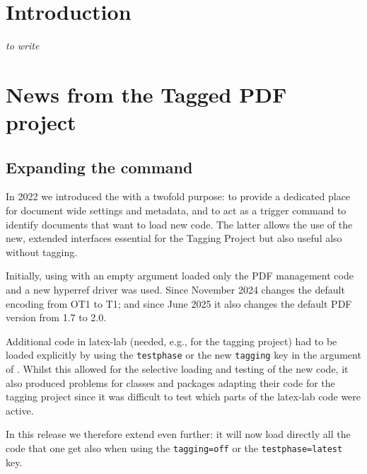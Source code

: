 \documentclass{ltnews}
\begin{document}
\maketitle
{  \spaceskip=3.33pt 
\tableofcontents}

\setlength{}

\medskip

\section{Introduction}

\emph{to write}


\section{News from the Tagged PDF project}

\subsection{Expanding the  command}

In 2022 we introduced the  with a twofold purpose:
to provide a dedicated place for document wide settings and metadata,
and to act as a trigger command to identify documents that want to load new code.
The latter allows the use of the new, extended interfaces essential for the Tagging Project
but also useful also without tagging.

Initially, using  with an empty argument loaded only the
PDF management code and a new hyperref driver was used.
Since November 2024  changes the default encoding from OT1 to
 T1; and since June 2025 it also changes the default PDF version from 1.7 to 2.0.

Additional code in latex-lab (needed, e.g., for the tagging project) had to be loaded
explicitly by using the \texttt{testphase} or the new \texttt{tagging} key in
the argument of . Whilst this allowed for the selective loading and
testing of the new code, it also produced problems for classes and packages adapting
their code for the tagging project
since it was difficult to test which parts of the latex-lab code were active.

In this release we therefore extend  even further: it
will now load directly all the code that one get also when using the \texttt{tagging=off} or
the \texttt{testphase=latest} key.
\end{document}

